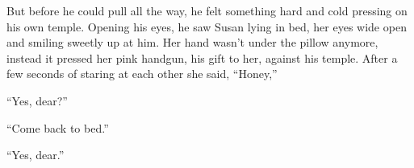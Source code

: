 \documentclass[11pt,letterpaper]{article}
\begin{document}
But before he could pull all the way, he felt something hard and cold pressing on his own temple. Opening his eyes, he saw Susan lying in bed, her eyes wide open and smiling sweetly up at him. Her hand wasn't under the pillow anymore, instead it pressed her pink handgun, his gift to her, against his temple. After a few seconds of staring at each other she said, ``Honey,''

``Yes, dear?''

``Come back to bed.''

``Yes, dear.''

\end{document}
